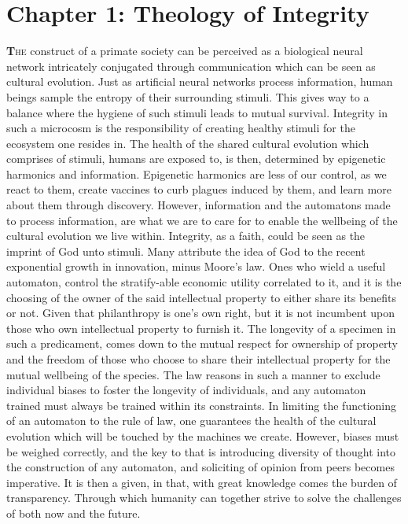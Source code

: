 \documentclass[ebook,12pt,oneside,openany]{memoir}
\begin{document}
\chapter*{Chapter 1: Theology of Integrity}
\lettrine[lines=2]{\fontsize{48}{56}\selectfont\textbf{T}}{he} construct of a primate society can be perceived as a biological neural network intricately conjugated through communication which can be seen as cultural evolution. Just as artificial neural networks process information, human beings sample the entropy of their surrounding stimuli. This gives way to a balance where the hygiene of such stimuli leads to mutual survival. Integrity in such a microcosm is the responsibility of creating healthy stimuli for the ecosystem one resides in.
The health of the shared cultural evolution which comprises of stimuli, humans are exposed to, is then, determined by epigenetic harmonics and information. Epigenetic harmonics are less of our control, as we react to them, create vaccines to curb plagues induced by them, and learn more about them through discovery. However, information and the automatons made to process information, are what we are to care for to enable the wellbeing of the cultural evolution we live within.
Integrity, as a faith, could be seen as the imprint of God unto stimuli. Many attribute the idea of God to the recent exponential growth in innovation, minus Moore’s law. Ones who wield a useful automaton, control the stratify-able economic utility correlated to it, and it is the choosing of the owner of the said intellectual property to either share its benefits or not. Given that philanthropy is one's own right, but it is not incumbent upon those who own intellectual property to furnish it.
The longevity of a specimen in such a predicament, comes down to the mutual respect for ownership of property and the freedom of those who choose to share their intellectual property for the mutual wellbeing of the species.
	The law reasons in such a manner to exclude individual biases to foster the longevity of individuals, and any automaton trained must always be trained within its constraints.
	In limiting the functioning of an automaton to the rule of law, one guarantees the health of the cultural evolution which will be touched by the machines we create. However, biases must be weighed correctly, and the key to that is introducing diversity of thought into the construction of any automaton, and soliciting of opinion from peers becomes imperative.
	It is then a given, in that, with great knowledge comes the burden of transparency. Through which humanity can together strive to solve the challenges of both now and the future.
\end{document}
